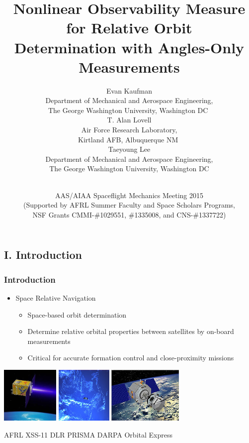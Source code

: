\documentclass[hyperref={pdftex,pdfpagemode=none,pdfstartview=FitH},10pt]{beamer}
\title[Nonlinear Observability Measure for Relative Orbit Determination]
{Nonlinear Observability Measure for Relative Orbit
\\
Determination with Angles-Only Measurements}
\author{
Evan Kaufman\\
{\footnotesize\selectfont Department of Mechanical and Aerospace Engineering,\\
The George Washington University, Washington DC}
$ $\\
\vspace*{0.015\columnwidth}
T. Alan Lovell\\
{\footnotesize\selectfont Air Force Research Laboratory,\\ Kirtland AFB, Albuquerque NM}
$ $\\
\vspace*{0.015\columnwidth}
Taeyoung Lee\\
{\footnotesize\selectfont Department of Mechanical and Aerospace Engineering,\\
The George Washington University, Washington DC}
}
\date{\vspace*{-0.8cm}\\AAS/AIAA Spaceflight Mechanics Meeting 2015\vspace*{0.1cm}\\
\footnotesize\selectfont (Supported by AFRL Summer Faculty and Space Scholars Programs,\\ NSF Grants CMMI-\#1029551, \#1335008, and CNS-\#1337722)}
\begin{document}
\begin{frame}
  \titlepage
\end{frame}


\section*{}
\subsection*{I. Introduction}


\begin{frame}
\frametitle{Introduction}
\begin{itemize}
\item Space Relative Navigation
	\begin{itemize}
	\item Space-based orbit determination
	\item Determine relative orbital properties between satellites by on-board measurements
	\item Critical for accurate formation control and close-proximity missions\\
	\end{itemize}
\end{itemize}

\vfill
\centerline{
\includegraphics[height=2.7cm]{XSS11.jpg}\hspace*{0.2cm}
\includegraphics[height=2.7cm]{DLRPrisma.jpg}\hspace*{0.2cm}
\includegraphics[height=2.7cm]{OrbitalExpress.jpg}}
\centerline{\scriptsize\selectfont
AFRL XSS-11\hspace*{1.5cm} DLR PRISMA\hspace*{1.5cm} DARPA Orbital Express}
\end{frame}
\end{document}
